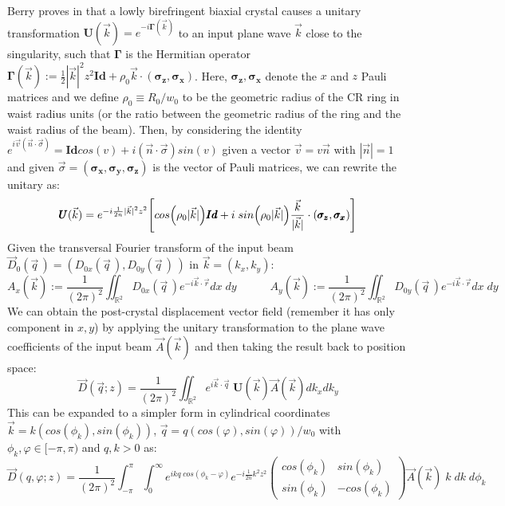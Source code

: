 \documentclass[11pt, a4paper, twoside]{article} %
\newcommand{\R}{\mathbb{R}} %
\begin{document}
Berry proves in \cite{Berry, BerryJeffrey} that a lowly birefringent biaxial crystal causes a unitary transformation $\pmb{U}(\vec{k})=e^{-i\pmb{\Gamma}(\vec{k})}$ to an input plane wave $\vec{k}$ close to the singularity, such that $\pmb{\Gamma}$ is the Hermitian operator $\pmb{\Gamma}(\vec{k}):=\frac{1}{2}|\vec{k}|^2z^2\pmb{Id}+\rho_0\vec{k}\cdot (\pmb{\sigma_z}, \pmb{\sigma_x})$. Here, $\pmb{\sigma_z}, \pmb{\sigma_x}$ denote the $x$ and $z$ Pauli matrices and we define $\rho_0\equiv R_0/w_0$ to be the geometric radius of the CR ring in waist radius units (or the ratio between the geometric radius of the ring and the waist radius of the beam). Then, by considering the identity $e^{i\vec{v}(\vec{n}\cdot \vec{\sigma})}=\pmb{Id}cos(v)+i(\vec{n}\cdot \vec{\sigma}) sin(v)$ given a vector $\vec{v}=v\vec{n}$ with $|\vec{n}|=1$ and given $\vec{\sigma}=(\pmb{\sigma_x},\pmb{\sigma_y},\pmb{\sigma_z})$ is the vector of Pauli matrices, we can rewrite the unitary as:\vspace{-0.1cm}
\begin{equation}
\pmb{U}(\vec{k}) = e^{-i\frac{1}{2n}|\vec{k}|^2z^2}\qty[cos\qty(\rho_0|\vec{k}|)\pmb{Id}+i\;sin\qty(\rho_0|\vec{k}|)\frac{\vec{k}}{|\vec{k}|}\cdot (\pmb{\sigma_z},\pmb{\sigma_x})]\vspace{-0.1cm}
\end{equation}
Given the transversal Fourier transform of the input beam $\vec{D}_0(\vec{q}\,)=(D_{0x}(\vec{q}\,), D_{0y}(\vec{q}\,)\,)$ in $\vec{k}=(k_x,k_y)$:
\begin{equation}
A_x(\vec{k}):=\frac{1}{(2\pi)^2}\iint_{\R^2} D_{0x}(\vec{q}\,)e^{-i\vec{k}\cdot\vec{r}}dx\;dy \quad \quad \quad A_y(\vec{k}):=\frac{1}{(2\pi)^2}\iint_{\R^2} D_{0y}(\vec{q}\,)e^{-i\vec{k}\cdot\vec{r}}dx\;dy
\end{equation}
We can obtain the post-crystal displacement vector field (remember it has only component in $x,y$) by applying the unitary transformation to the plane wave coefficients of the input beam $\vec{A}(\vec{k})$ and then taking the result back to position space:
\begin{equation}
\vec{D}(\vec{q};z)=\frac{1}{(2\pi)^2}\iint_{\R^2}e^{i\vec{k}\cdot\vec{q}}\;\pmb{U}(\vec{k})\vec{A}(\vec{k})dk_xdk_y
\end{equation}
This can be expanded to a simpler form in cylindrical coordinates $\vec{k}=k(cos(\phi_k),sin(\phi_k))$, $\vec{q}=q(cos(\varphi), sin(\varphi))/w_0$ with $\phi_k,\varphi\in[-\pi,\pi)$ and $q,k>0$ as:
\begin{equation}\label{geez}
\vec{D}(q,\varphi;z)=\frac{1}{(2\pi)^2}\int_{-\pi}^{\pi}\int_{0}^\infty e^{ikq \;cos(\phi_k-\varphi)}e^{-i\frac{1}{2n}k^2z^2}\begin{pmatrix}
cos(\phi_k) & sin(\phi_k)\\
sin(\phi_k) & -cos(\phi_k)
\end{pmatrix} \vec{A}(\vec{k})\;k\;dk\;d\phi_k
\end{equation}
\end{document}
